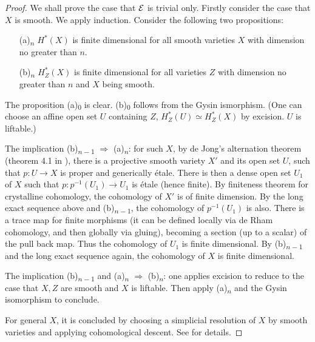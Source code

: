 \begin{proof}
    We shall prove the case that ${\mathcal {E}}$ is trivial only. 
    Firstly consider the case that $X$ is smooth. 
    We apply induction. Consider the following two propositions:
    \begin{itemize}
        \item [(a)\textsubscript{$n$}] 
            $H^*(X)$ is finite dimensional for all smooth varieties $X$ 
            with dimension no greater than $n$.
        \item [(b)\textsubscript{$n$}] 
            $H^*_Z(X)$ is finite dimensional for all varieties $Z$ 
            with dimension no greater than $n$ and $X$ being smooth.
    \end{itemize}
    The proposition (a)\textsubscript{$0$} is clear. 
    (b)\textsubscript{$0$} follows from the Gysin ismorphism. 
    (One can choose an affine open set $U$ containing $Z$, 
    $H^*_Z(U) \simeq H^*_Z(X)$ by excision. $U$ is liftable.)

    The implication (b)\textsubscript{$n-1$} $\Rightarrow$ (a)\textsubscript{$n$}: 
    for such $X$, by de Jong's alternation theorem (theorem 4.1 in \cite{dJ}), 
    there is a projective smooth variety $X'$ and its open set $U$, 
    such that $p \colon U \to X$ is proper and generically \'etale. 
    There is then a dense open set $U_1$ of $X$ such that 
    $p \colon p^{-1}(U_1) \to U_1$ is \'etale (hence finite). 
    By finiteness theorem for crystalline cohomology, 
    the cohomology of $X'$ is of finite dimension. 
    By the long exact sequence above and (b)\textsubscript{$n-1$}, 
    the cohomology of $p^{-1}(U_1)$ is also. 
    There is a trace map for finite morphisms 
    (it can be defined locally via de Rham cohomology, and then globally via gluing), 
    becoming a section (up to a scalar) of the pull back map. 
    Thus the cohomology of $U_1$ is finite dimensional. 
    By (b)\textsubscript{$n-1$} and the long exact sequence again, 
    the cohomology of $X$ is finite dimensional.

    The implication (b)\textsubscript{$n-1$} and 
    (a)\textsubscript{$n$} $\Rightarrow$ (b)\textsubscript{$n$}: 
    one applies excision to reduce to the case that $X, Z$ are smooth and $X$ is liftable. 
    Then apply (a)\textsubscript{$n$} and the Gysin isomorphism to conclude.

    For general $X$, it is concluded by choosing a simplicial resolution of $X$ 
    by smooth varieties and applying cohomological descent. 
    See \cite{Tsu} for details. 
\end{proof}

